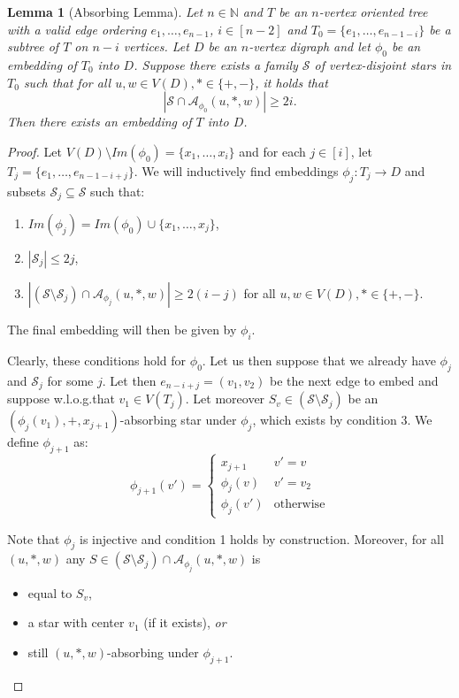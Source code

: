 \documentclass[10pt, a4paper]{article}
\newtheorem{lemma}[theorem]{Lemma}
\theoremstyle{remark}
\begin{document}
\begin{lemma}[Absorbing Lemma]\label{lemma:absorbing}
    Let $n\in \mathbb{N}$ and $T$ be an $n$-vertex oriented tree with a valid edge ordering $e_1, \dots, e_{n-1}$, $i \in [n-2]$ and $T_0 = \{ e_1, \dots, e_{n-1 - i}\}$ be a subtree of $T$ on $n-i$ vertices.
    Let $D$ be an $n$-vertex digraph and let $\phi_0$ be an embedding of $T_0$ into $D$.
    Suppose there exists a family $\mathcal{S}$ of vertex-disjoint stars in $T_0$ such that for all  $ u,w \in V(D), * \in \{+, -\}$, it holds that
    \[ |\mathcal{S} \cap \mathcal{A}_{\phi_0}(u,*,w)| \geq 2i.\]
    Then there exists an embedding of $T$ into $D$.
\end{lemma}
\begin{proof}
    Let $V(D) \setminus Im(\phi_0) = \{x_1, \dots, x_i\}$ and for each $j \in [i]$, let $T_{j} = \{ e_1, \dots, e_{n-1 - i + j}\}$.
    We will inductively find embeddings $\phi_j: T_j \to D$ and subsets $\mathcal{S}_j \subseteq \mathcal{S}$ such that:
    \begin{enumerate}
        \item $Im(\phi_j) = Im(\phi_0) \cup \{x_1, \dots, x_j\}$,
        \item $|\mathcal{S}_j| \leq 2j$,
        \item $|(\mathcal{S}\setminus \mathcal{S}_j) \cap \mathcal{A}_{\phi_j}(u,*,w)| \geq 2(i-j)$ for all $u,w \in V(D), * \in \{+, -\}.$
    \end{enumerate}
    The final embedding will then be given by $\phi_i$.

    Clearly, these conditions hold for $\phi_0$.
    Let us then suppose that we already have $\phi_j$ and $\mathcal{S}_j$ for some $j$.
    Let then $e_{n - i + j} = (v_1, v_2)$ be the next edge to embed and suppose w.l.o.g.\footnotemark that $v_1 \in V(T_j)$.
    Let moreover $S_v \in (\mathcal{S}\setminus \mathcal{S}_j)$ be an $(\phi_j(v_1), +, x_{j+1})$-absorbing star under $\phi_j$,
    which exists by condition 3.
    We define $\phi_{j+1}$ as:
    \[\phi_{j+1}(v') = \begin{cases}
        x_{j+1} & v' = v \\
        \phi_j(v) & v' = v_2 \\
        \phi_j(v') & \text{otherwise}
    \end{cases}\]

    Note that $\phi_j$ is injective and condition 1 holds by construction.
    Moreover, for all $(u,*,w)$ any $S \in (\mathcal{S}\setminus \mathcal{S}_j) \cap \mathcal{A}_{\phi_j}(u,*,w)$ is
    \begin{itemize}
        \item equal to $S_v$,
        \item a star with center $v_1$ (if it exists), \emph{or}
        \item still $(u,*,w)$-absorbing under $\phi_{j+1}$.
    \end{itemize}
    

\end{proof}
\end{document}

